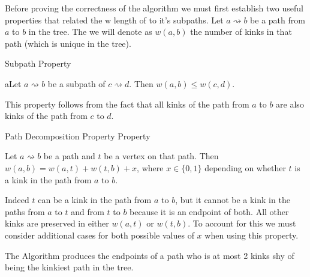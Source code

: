 Before proving the correctness of the algorithm we must first establish two useful properties that related the w length of to it's subpaths.
Let $a \rightsquigarrow b$ be a path from $a$ to $b$ in the tree. The we will denote as $w(a, b)$ the number of kinks in that path (which is unique in the tree).

\begin{defn} Subpath Property  \end{defn}

aLet $a \rightsquigarrow b$ be a subpath of $c \rightsquigarrow d$. Then $w(a, b) \le w(c, d)$. 

This property follows from the fact that all kinks of the path from $a$ to $b$ are also kinks of the path from $c$ to $d$.

\begin{defn} Path Decomposition Property Property  \end{defn}

Let $a \rightsquigarrow b$ be a path and $t$ be a vertex on that path. Then $w(a, b) = w(a, t) + w(t, b) + x$, where $x \in \{0 ,1\}$ depending on whether $t$ is a kink in the path from $a$ to $b$. 

Indeed $t$ can be a kink in the path from $a$ to $b$, but it cannot be a kink in the paths from $a$ to $t$ and from $t$ to $b$ because it is an endpoint of both. All other kinks are preserved in either $w(a, t)$ or $w(t, b)$. To account for this we must consider additional cases for both possible values of $x$ when using this property.



\begin{lem} The Algorithm produces the endpoints of a path who is at most 2 kinks shy of being the kinkiest path in the tree. \end{lem}


